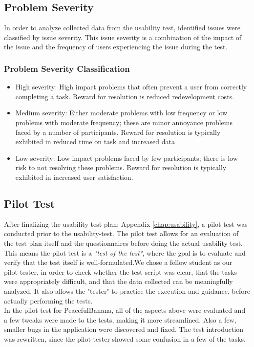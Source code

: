 \subsection{Problem Severity}
In order to analyze collected data from the usability test, identified issues were classified by issue severity. This issue severity is a combination of the impact of the issue and the frequency of users experiencing the issue during the test. 
\subsubsection{Problem Severity Classification}
	\begin{itemize}
		\item High severity: High impact problems that often prevent a user from correctly completing a task. Reward for resolution is reduced redevelopment costs.
		\item Medium severity: Either moderate problems with low frequency or low problems with moderate frequency; these are minor annoyance problems faced by a number of participants. Reward for resolution is typically exhibited in reduced time on task and increased data
		\item Low severity: Low impact problems faced by few participants; there is low risk to not resolving these problems. Reward for resolution is typically exhibited in increased user satisfaction.
	\end{itemize}

\subsection*{Pilot Test}
After finalizing the usability test plan: Appendix \ref{chap:usability}, a pilot test was conducted prior to the usability-test\citep{usabilitygov}. The pilot test allows for an evaluation of the test plan itself and the questionnaires before doing the actual usability test. This means the pilot test is a \emph{"test of the test"}, where the goal is to evaluate and verify that the test itself is well-formulated.We chose a fellow student as our pilot-tester, in order to check whether the test script was clear, that the tasks were appropriately difficult, and that the data collected can be meaningfully analyzed. 
It also allows the "tester" to practice the execution and guidance, before actually performing the tests. \\
In the pilot test for PeacefulBanana, all of the aspects above were evaluated and a few tweaks were made to the tests, making it more streamlined. Also a few, smaller bugs in the application were discovered and fixed. The test introduction was rewritten, since the pilot-tester showed some confusion in a few of the tasks. 

